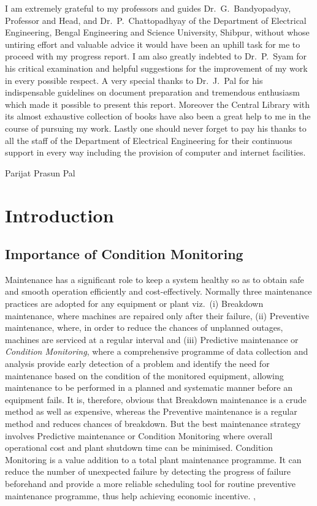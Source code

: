 \documentclass[a4paper,11pt]{article}
\begin{document}
\noindent I am extremely grateful to my professors and guides Dr.~G.~Bandyopadyay, Professor and Head, and Dr.~P.~Chattopadhyay of the Department of Electrical Engineering, Bengal Engineering and Science University, Shibpur, without whose untiring effort and valuable advice it would have been an uphill task for me to proceed with my progress report. I am also greatly indebted to Dr.~P.~Syam for his critical examination and helpful suggestions for the improvement of my work in every possible respect. A very special thanks to Dr.~J.~Pal for his indispensable guidelines on document preparation and tremendous enthusiasm which made it possible to present this report. Moreover the Central Library with its almost exhaustive collection of books have also been a great help to me in the course of pursuing my work. Lastly one should never forget to pay his thanks to all the staff of the Department of Electrical Engineering for their continuous support in every way including the provision of computer and internet facilities.

\vspace{25mm}
\hspace*{100mm} Parijat Prasun Pal\\
\clearpage

\tableofcontents
\clearpage
\listoffigures
\clearpage

\section{Introduction}
\subsection{Importance of Condition Monitoring}
Maintenance has a significant role to keep a system healthy so as to obtain safe and smooth operation efficiently and cost-effectively. Normally three maintenance practices are adopted for any equipment or plant viz.~(i) Breakdown maintenance, where machines are repaired only after their failure, (ii) Preventive maintenance, where, in order to reduce the chances of unplanned outages, machines are serviced at a regular interval and (iii) Predictive maintenance or \emph{Condition Monitoring}, where a comprehensive programme of data collection and analysis provide early detection of a problem and identify the need for maintenance based on the condition of the monitored equipment, allowing maintenance to be performed in a planned and systematic manner before an equipment fails. It is, therefore, obvious that Breakdown maintenance is a crude method as well as expensive, whereas the Preventive maintenance is a regular method and reduces chances of breakdown. But the best maintenance strategy involves Predictive maintenance or Condition Monitoring where overall operational cost and plant shutdown time can be minimised. Condition Monitoring is a value addition to a total plant maintenance programme. It can reduce the number of unexpected failure by detecting the progress of failure beforehand and provide a more reliable scheduling tool for routine preventive maintenance programme, thus help achieving economic incentive. \cite{Penman},\cite{rps1} 
\end{document}
